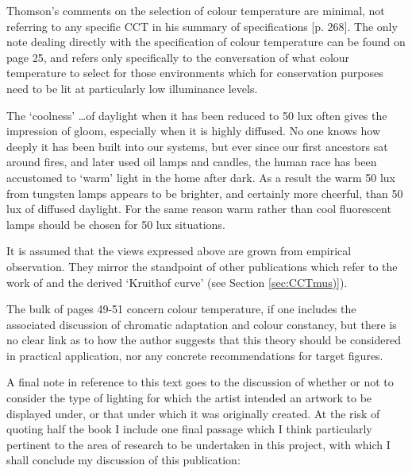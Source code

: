 Thomson's comments on the selection of colour temperature are minimal, not referring to any specific \gls{CCT} in his summary of specifications [p. 268]. The only note dealing directly with the specification of colour temperature can be found on page 25, and refers only specifically to the conversation of what colour temperature to select for those environments which for conservation purposes need to be lit at particularly low illuminance levels.

\begin{itquote}{}
The `coolness' \dots of daylight when it has been reduced to 50 lux often gives the impression of gloom, especially when it is highly diffused. No one knows how deeply it has been built into our systems, but ever since our first ancestors sat around fires, and later used oil lamps and candles, the human race has been accustomed to `warm' light in the home after dark. As a result the warm 50 lux from tungsten lamps appears to be brighter, and certainly more cheerful, than 50 lux of diffused daylight. For the same reason warm rather than cool fluorescent lamps should be chosen for 50 lux situations.
\end{itquote}

It is assumed that the views expressed above are grown from empirical observation. They mirror the standpoint of other publications which refer to the work of \citet{kruithof_tubular_1941} and the derived `Kruithof curve' (see Section \ref{sec:CCTmus)}).

The bulk of pages 49-51 concern colour temperature, if one includes the associated discussion of chromatic adaptation and colour constancy, but there is no clear link as to how the author suggests that this theory should be considered in practical application, nor any concrete recommendations for target figures.

A final note in reference to this text goes to the discussion of whether or not to consider the type of lighting for which the artist intended an artwork to be displayed under, or that under which it was originally created. At the risk of quoting half the book I include one final passage which I think particularly pertinent to the area of research to be undertaken in this project, with which I shall conclude my discussion of this publication:

